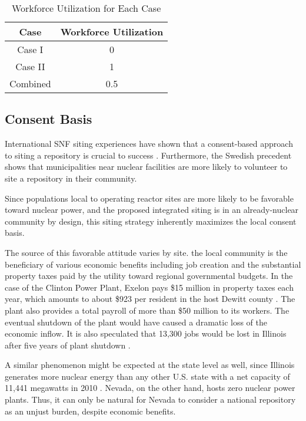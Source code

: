 \begin{table}[h]
	\centering
        \caption {Workforce Utilization for Each Case}
		\begin{tabular}{|c|c|}
			\hline
			Case & Workforce Utilization \\
			\hline
			Case I & 0 \\
			Case II & 1 \\
			Combined & 0.5\\ 
			\hline
                \end{tabular}
\end{table}


\subsection{Consent Basis}

International \gls{SNF} siting experiences have shown that a consent-based
approach to siting a repository is crucial to success
\cite{ayers_blue_2012,doe_designing_2016,jenkins-smith_public_2013,freeze_siting_2015}. 
Furthermore, the Swedish precedent \cite{olsson_experiences_2013} shows that 
municipalities near nuclear facilities
are more likely to volunteer to site a repository in their community.

Since populations local to operating reactor sites are more likely to be 
favorable toward nuclear power, and the proposed integrated siting 
is in an already-nuclear community by design, this siting strategy inherently 
maximizes the local consent basis.

The source of this favorable attitude varies by site. 
the local community is the beneficiary of various economic benefits
including job creation and the substantial property taxes paid by the utility 
toward regional governmental budgets.   In the case of the Clinton Power Plant, 
Exelon pays \$15 million in property taxes each year, which amounts to about 
\$923 per resident in the host Dewitt county \cite{brady-lunny_dewitt_2016}. The plant
also provides a total payroll of more than \$50 million to its workers.
The eventual shutdown of the plant would have caused a dramatic loss of the economic inflow.
It is also speculated that 13,300 jobs would be lost in Illinois after five years 
of plant shutdown \cite{reid_study:_2014}.  

A similar phenomenon might be expected at the state level as well, since 
Illinois generates more nuclear energy than any other U.S.  state with a net 
capacity of 11,441 megawatts in 2010 \cite{eia_state_2012}. Nevada, on the other 
hand, hosts zero nuclear power plants. Thus, it can only be natural for Nevada 
to consider a national repository as an unjust burden, despite economic 
benefits.  


